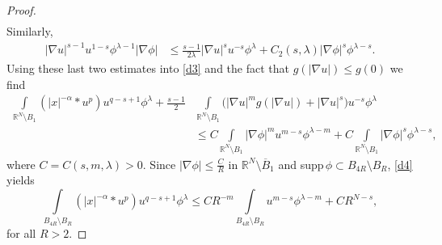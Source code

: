 \documentclass[leqno,12pt]{article}
\numberwithin{equation}{section}
\newcommand{\R}{\mathbb R}
\newcommand{\Ro}{\mathbb R^N\setminus \overline B_1}
\begin{document}
\begin{proof}
$$\begin{aligned}
\end{aligned}
$$
Similarly,
$$
\begin{aligned}
|\nabla u|^{s-1}u^{1-s}\phi^{\lambda-1}|\nabla \phi|&\leq \frac{s-1}{2\lambda}|\nabla u|^{s} u^{-s}\phi^\lambda+C_2(s,\lambda)|\nabla \phi|^{s}\phi^{\lambda-s}.
\end{aligned}
$$
Using these last two estimates into \eqref{d3} and the fact that $g(|\nabla u|)\leq g(0)$ we find
\begin{equation}\label{d4}
\begin{aligned}
\int\limits_{\R^N\setminus B_1}(|x|^{-\alpha}*u^p) u^{q-s+1}\phi^\lambda+\frac{s-1}{2} & \int\limits_{\R^N\setminus B_1}\Big(|\nabla u|^{m}g(|\nabla u|)+|\nabla u|^{s}\Big) u^{-s}\phi^\lambda\\
&\leq C\int\limits_{\R^N\setminus B_1} |\nabla \phi|^{m} u^{m-s}\phi^{\lambda-m} +C\int\limits_{\R^N\setminus B_1}  |\nabla \phi|^{s}\phi^{\lambda-s},
\end{aligned}
\end{equation}
where $C=C(s, m, \lambda)>0$. Since $|\nabla \phi|\leq \frac{C}{R}$ in $\Ro$ and supp$\,\phi\subset B_{4R}\setminus B_{R}$, \eqref{d4} yields
\begin{equation}\label{d5}
\int\limits_{B_{4R}\setminus B_R}(|x|^{-\alpha}*u^p) u^{q-s+1}\phi^\lambda \leq CR^{-m}\int\limits_{B_{4R}\setminus B_R} u^{m-s}\phi^{\lambda-m} +CR^{N-s},
\end{equation}
for all $R>2$. 


\end{proof}
\end{document}
